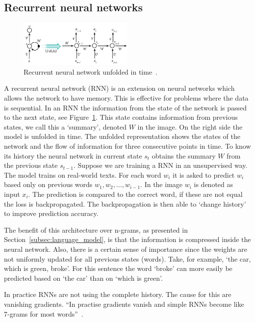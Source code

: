 \subsection{Recurrent neural networks}
\label{subsec:rnn}
\begin{figure}[htbp]
    \begin{center}
        \includegraphics[width=0.5\textwidth]{figures/rnn.jpg}
    \end{center}
    \caption{Recurrent neural network unfolded in time~\cite[Figure 5]{lecun2015deep}.}
    \label{fig:rnn}
\end{figure}
A recurrent neural network (RNN) is an extension on neural networks which allows the network to have memory.
This is effective for problems where the data is sequential.
In an RNN the information from the state of the network is passed to the next state, see Figure~\ref{fig:rnn}.
This state contains information from previous states, we call this a `summary', denoted $W$ in the image.
On the right side the model is unfolded in time.
The unfolded representation shows the states of the network and the flow of information for three consecutive points in time.
To know its history the neural network in current state $s_t$ obtains the summary $W$ from the previous state $s_{t-1}$.
Suppose we are training a RNN in an unsupervised way.
The model trains on real-world texts.
For each word $w_i$ it is asked to predict $w_i$ based only on previous words $w_1, w_2, \ldots, w_{i-1}$.
In the image $w_i$ is denoted as input $x_i$.
The prediction is compared to the correct word, if these are not equal the loss is backpropagated.
The backpropagation is then able to `change history' to improve prediction accuracy.

The benefit of this architecture over n-grams, as presented in Section~\ref{subsec:language_model}, is that the information is compressed inside the neural network.
Also, there is a certain sense of importance since the weights are not uniformly updated for all previous states (words).
Take, for example, `the car, which is green, broke'.
For this sentence the word `broke' can more easily be predicted based on `the car' than on `which is green'.

In practice RNNs are not using the complete history.
The cause for this are vanishing gradients.
``In practise gradients vanish and simple RNNs become like 7-grams for most words''~\citep{manning2017lectures}.

